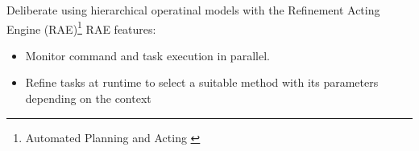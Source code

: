 \begin{frame}{Deliberate using hierarchical operatinal models with the Refinement Acting Engine (RAE)\footnote{Automated Planning and Acting \cite{ghallabAutomatedPlanningActing2016}}}
    RAE features:
    \begin{itemize}
        \item Monitor command and task execution in parallel.
        \item Refine tasks at runtime to select a suitable method with its parameters depending on the context
        
    \end{itemize}    
\end{frame}
    

